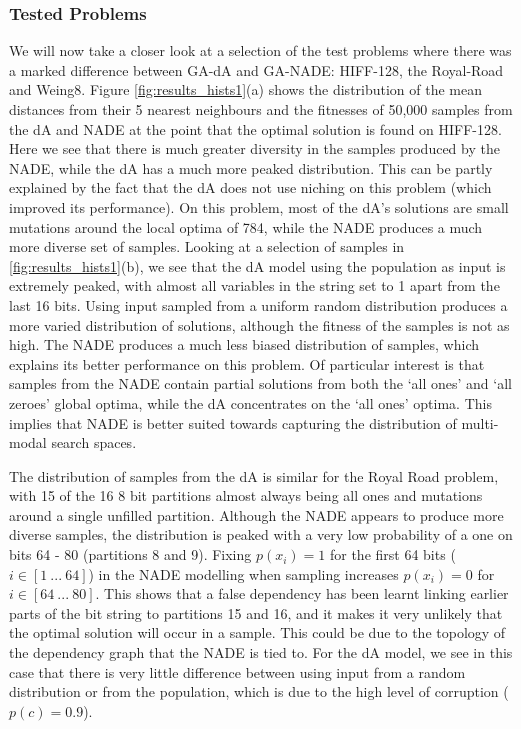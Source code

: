 \documentclass[twoside]{article}
\begin{document}
\subsubsection{Tested Problems}

We will now take a closer look at a selection of the test problems where there was a marked difference between GA-dA and GA-NADE: HIFF-128, the Royal-Road and Weing8. Figure \ref{fig:results_hists1}(a) shows the distribution of the mean distances from their 5 nearest neighbours and the fitnesses of 50,000 samples from the dA and NADE at the point that the optimal solution is found on HIFF-128. Here we see that there is much greater diversity in the samples produced by the NADE, while the dA has a much more peaked distribution. This can be partly explained by the fact that the dA does not use niching on this problem (which improved its performance). On this problem, most of the dA's solutions are small mutations around the local optima of 784, while the NADE produces a much more diverse set of samples. Looking at a selection of samples in \ref{fig:results_hists1}(b), we see that the dA model using the population as input is extremely peaked, with almost all variables in the string set to 1 apart from the last 16 bits. Using input sampled from a uniform random distribution produces a more varied distribution of solutions, although the fitness of the samples is not as high. The NADE produces a much less biased distribution of samples, which explains its better performance on this problem. Of particular interest is that samples from the NADE contain partial solutions from both the `all ones' and `all zeroes' global optima, while the dA concentrates on the `all ones' optima. This implies that NADE is better suited towards capturing the distribution of multi-modal search spaces.

The distribution of samples from the dA is similar for the Royal Road problem, with 15 of the 16 8 bit partitions almost always being all ones and mutations around a single unfilled partition. Although the NADE appears to produce more diverse samples, the distribution is peaked with a very low probability of a one on bits 64 - 80 (partitions 8 and 9). Fixing \(p(x_i)=1\) for the first 64 bits (\(i\in{[1\ ...\ 64]}\)) in the NADE modelling when sampling increases \(p(x_i)=0\) for \(i\in{[64\ ...\ 80]}\). This shows that a false dependency has been learnt linking earlier parts of the bit string to partitions 15 and 16, and it makes it very unlikely that the optimal solution will occur in a sample. This could be due to the topology of the dependency graph that the NADE is tied to. For the dA model, we see in this case that there is very little difference between using input from a random distribution or from the population, which is due to the high level of corruption (\(p(c)=0.9\)).
\end{document}
